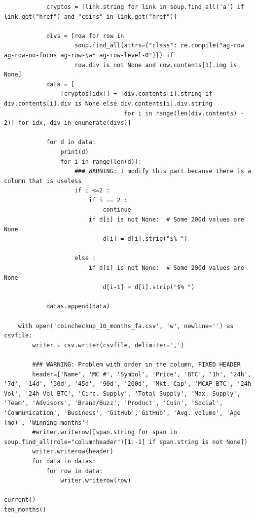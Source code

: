 \documentclass[11pt, english, letterpaper]{article}
\begin{document}
\begin{lstlisting}
            cryptos = [link.string for link in soup.find_all('a') if link.get("href") and "coins" in link.get("href")]

            divs = [row for row in
                    soup.find_all(attrs={"class": re.compile("ag-row ag-row-no-focus ag-row-\w* ag-row-level-0")}) if
                    row.div is not None and row.contents[1].img is None]
            data = [
                [cryptos[idx]] + [div.contents[i].string if div.contents[i].div is None else div.contents[i].div.string
                                  for i in range(len(div.contents) - 2)] for idx, div in enumerate(divs)]

            for d in data:
                print(d)
                for i in range(len(d)):
                    ### WARNING: I modify this part because there is a column that is useless
                    if i <=2 :
                        if i == 2 :
                            continue
                        if d[i] is not None:  # Some 200d values are None
                            d[i] = d[i].strip("$% ")

                    else :
                        if d[i] is not None:  # Some 200d values are None
                            d[i-1] = d[i].strip("$% ")

            datas.append(data)

    with open('coincheckup_10_months_fa.csv', 'w', newline='') as csvfile:
        writer = csv.writer(csvfile, delimiter=',')

        ### WARNING: Problem with order in the column, FIXED HEADER
        header=['Name', 'MC #', 'Symbol', 'Price', 'BTC', '1h', '24h', '7d', '14d', '30d', '45d', '90d', '200d', 'Mkt. Cap', 'MCAP BTC', '24h Vol', '24h Vol BTC', 'Circ. Supply', 'Total Supply', 'Max. Supply', 'Team', 'Advisors', 'Brand/Buzz', 'Product', 'Coin', 'Social', 'Communication', 'Business', 'GitHub','GitHub', 'Avg. volume', 'Age (mo)', 'Winning months']
        #writer.writerow([span.string for span in soup.find_all(role="columnheader")[1:-1] if span.string is not None])
        writer.writerow(header)
        for data in datas:
            for row in data:
                writer.writerow(row)

current()
ten_months()
\end{lstlisting}
\end{document}
